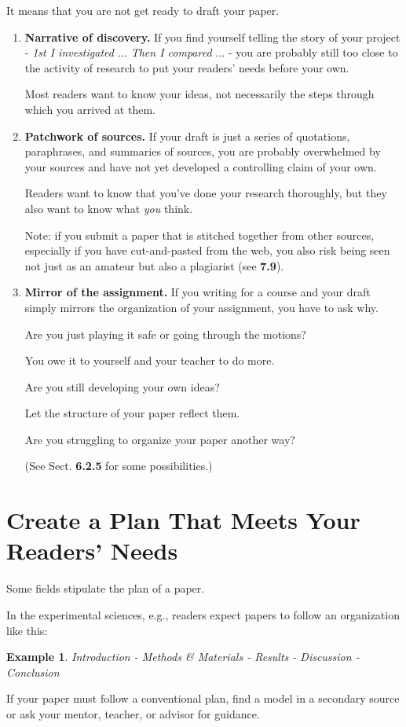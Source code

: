 \documentclass[oneside]{book}
\numberwithin{equation}{section}
\newtheorem{example}{Example}[section]
\begin{document}
It means that you are not get ready to draft your paper.
\begin{enumerate}
    \item \textbf{Narrative of discovery.} If you find yourself telling the story of your project - \textit{1st I investigated $\ldots$ Then I compared $\ldots$} - you are probably still too close to the activity of research to put your readers' needs before your own.
    
    Most readers want to know your ideas, not necessarily the steps through which you arrived at them.
    \item \textbf{Patchwork of sources.} If your draft is just a series of quotations, paraphrases, and summaries of sources, you are probably overwhelmed by your sources and have not yet developed a controlling claim of your own.
    
    Readers want to know that you've done your research thoroughly, but they also want to know what \textit{you} think.
    
    Note: if you submit a paper that is stitched together from other sources, especially if you have cut-and-pasted from the web, you also risk being seen not just as an amateur but also a plagiarist (see \textbf{7.9}).
    \item \textbf{Mirror of the assignment.} If you writing for a course and your draft simply mirrors the organization of your assignment, you have to ask why.
    
    Are you just playing it safe or going through the motions?
    
    You owe it to yourself and your teacher to do more.
    
    Are you still developing your own ideas?
    
    Let the structure of your paper reflect them.
    
    Are you struggling to organize your paper another way?
    
    (See Sect. \textbf{6.2.5} for some possibilities.)
\end{enumerate}

\section{Create a Plan That Meets Your Readers' Needs}
Some fields stipulate the plan of a paper.

In the experimental sciences, e.g., readers expect papers to follow an organization like this:
\begin{example}
    Introduction - Methods \& Materials - Results - Discussion - Conclusion
\end{example}
If your paper must follow a conventional plan, find a model in a secondary source or ask your mentor, teacher, or advisor for guidance.
\end{document}
